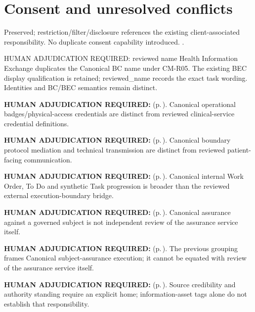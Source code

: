 \section{Consent and unresolved conflicts}
Preserved; restriction/filter/disclosure references the existing client-associated responsibility. No duplicate consent capability introduced. .


HUMAN ADJUDICATION REQUIRED: reviewed name Health Information Exchange duplicates the Canonical BC name under CM-R05. The existing BEC display qualification is retained; reviewed\_name records the exact task wording. Identities and BC/\allowbreak{}BEC semantics remain distinct.

\par\textbf{HUMAN ADJUDICATION REQUIRED:}  (p.\,\pageref{cap:bec-credential-management}). Canonical operational badges/physical-access credentials are distinct from reviewed clinical-service credential definitions.
\par\textbf{HUMAN ADJUDICATION REQUIRED:}  (p.\,\pageref{cap:bec-health-information-communication}). Canonical boundary protocol mediation and technical transmission are distinct from reviewed patient-facing communication.
\par\textbf{HUMAN ADJUDICATION REQUIRED:}  (p.\,\pageref{cap:bec-workflow-activity-coordination}). Canonical internal Work Order, To Do and synthetic Task progression is broader than the reviewed external execution-boundary bridge.
\par\textbf{HUMAN ADJUDICATION REQUIRED:}  (p.\,\pageref{cap:bec-governed-assurance}). Canonical assurance against a governed subject is not independent review of the assurance service itself.
\par\textbf{HUMAN ADJUDICATION REQUIRED:}  (p.\,\pageref{cap:bec-independent-assurance-evaluation-enablement}). The previous grouping frames Canonical subject-assurance execution; it cannot be equated with review of the assurance service itself.
\par\textbf{HUMAN ADJUDICATION REQUIRED:}  (p.\,\pageref{cap:bec-information-authority-representation}). Source credibility and authority standing require an explicit home; information-asset tags alone do not establish that responsibility.

